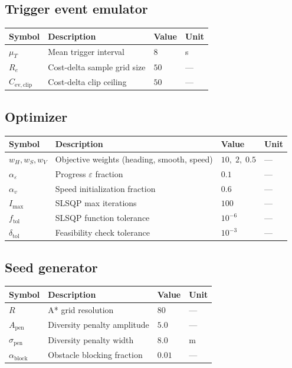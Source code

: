 \documentclass[11pt,a4paper]{article}
\begin{document}
\subsection*{Trigger event emulator}

\begin{center}
\begin{tabular}{llll}
\toprule
Symbol & Description & Value & Unit \\
\midrule
$\mu_T$               & Mean trigger interval         & $8$    & s \\
$R_e$                 & Cost-delta sample grid size   & $50$   & --- \\
$C_{\mathrm{ev,clip}}$& Cost-delta clip ceiling       & $50$   & --- \\
\bottomrule
\end{tabular}
\end{center}

\subsection*{Optimizer}

\begin{center}
\begin{tabular}{llll}
\toprule
Symbol & Description & Value & Unit \\
\midrule
$w_H, w_S, w_V$          & Objective weights (heading, smooth, speed) & $10,\;2,\;0.5$ & --- \\
$\alpha_\varepsilon$      & Progress $\varepsilon$ fraction            & $0.1$          & --- \\
$\alpha_v$                & Speed initialization fraction              & $0.6$          & --- \\
$I_{\max}$                & SLSQP max iterations                       & $100$          & --- \\
$f_{\mathrm{tol}}$        & SLSQP function tolerance                   & $10^{-6}$      & --- \\
$\delta_{\mathrm{tol}}$   & Feasibility check tolerance                & $10^{-3}$      & --- \\
\bottomrule
\end{tabular}
\end{center}

\subsection*{Seed generator}

\begin{center}
\begin{tabular}{llll}
\toprule
Symbol & Description & Value & Unit \\
\midrule
$R$                      & A* grid resolution             & $80$  & --- \\
$A_{\mathrm{pen}}$       & Diversity penalty amplitude    & $5.0$ & --- \\
$\sigma_{\mathrm{pen}}$  & Diversity penalty width        & $8.0$ & m \\
$\alpha_{\mathrm{block}}$& Obstacle blocking fraction     & $0.01$& --- \\
\bottomrule
\end{tabular}
\end{center}
\end{document}
